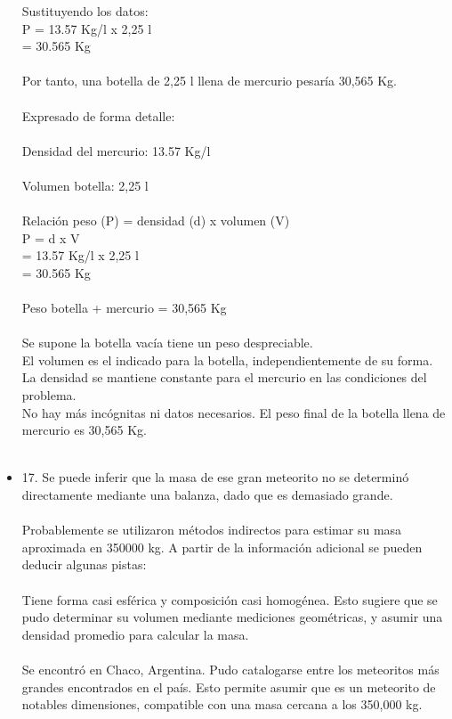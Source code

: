 \documentclass{article}
\begin{document}
\begin{itemize}
Sustituyendo los datos:\\
P = 13.57 Kg/l x 2,25 l\\
= 30.565 Kg\\
\\
Por tanto, una botella de 2,25 l llena de mercurio pesaría 30,565 Kg.\\
\\
Expresado de forma detalle:\\
\\
Densidad del mercurio: 13.57 Kg/l\\
\\
Volumen botella: 2,25 l\\
\\
Relación peso (P) = densidad (d) x volumen (V)\\
P = d x V\\
= 13.57 Kg/l x 2,25 l\\
= 30.565 Kg\\
\\
Peso botella + mercurio = 30,565 Kg\\
\\
Se supone la botella vacía tiene un peso despreciable.\\
El volumen es el indicado para la botella, independientemente de su forma.\\
La densidad se mantiene constante para el mercurio en las condiciones del problema.\\
No hay más incógnitas ni datos necesarios. El peso final de la botella llena de mercurio es 30,565 Kg.\\
\\
\item{17.}
Se puede inferir que la masa de ese gran meteorito no se determinó directamente mediante una balanza, dado que es demasiado grande.\\
\\
Probablemente se utilizaron métodos indirectos para estimar su masa aproximada en 350000 kg. A partir de la información adicional se pueden deducir algunas pistas:\\
\\
Tiene forma casi esférica y composición casi homogénea. Esto sugiere que se pudo determinar su volumen mediante mediciones geométricas, y asumir una densidad promedio para calcular la masa.\\
\\
Se encontró en Chaco, Argentina. Pudo catalogarse entre los meteoritos más grandes encontrados en el país. Esto permite asumir que es un meteorito de notables dimensiones, compatible con una masa cercana a los 350,000 kg.\\

\end{itemize}
\end{document}
